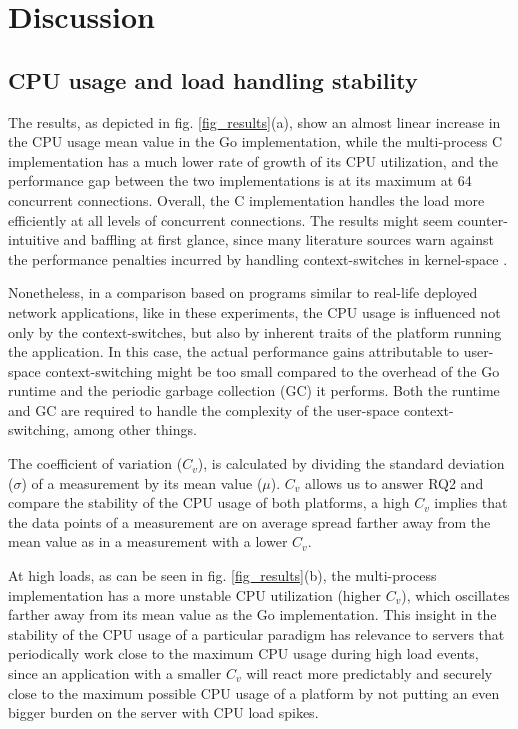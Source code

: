 \section{Discussion}
\subsection{CPU usage and load handling stability}
The results, as depicted in fig. \ref{fig_results}(a), show an almost linear increase in the CPU usage mean value in the Go implementation, while the multi-process C implementation has a much lower rate of growth of its CPU utilization, and the performance gap between the two implementations is at its maximum at 64 concurrent connections. Overall, the C implementation handles the load more efficiently at all levels of concurrent connections. The results might seem counter-intuitive and baffling at first glance, since many literature sources warn against the performance penalties incurred by handling context-switches in kernel-space \cite{Cox-Buday2017}\cite{Kerrisk2010}. 

Nonetheless, in a comparison based on programs similar to real-life deployed network applications, like in these experiments, the CPU usage is influenced not only by the context-switches, but also by inherent traits of the platform running the application. In this case, the actual performance gains attributable to user-space context-switching might be too small compared to the overhead of the Go runtime and the periodic garbage collection (GC) it performs. Both the runtime and GC are required to handle the complexity of the user-space context-switching, among other things.

The coefficient of variation ($C_v$), is calculated by dividing the standard deviation ($\sigma$) of a measurement by its mean value ($\mu$). $C_v$ allows us to answer RQ2 and compare the stability of the CPU usage of both platforms, a high $C_v$ implies that the data points of a measurement are on average spread farther away from the mean value as in a measurement with a lower $C_v$. 

At high loads, as can be seen in fig. \ref{fig_results}(b), the multi-process implementation has a more unstable CPU utilization (higher $C_v$), which oscillates farther away from its mean value as the Go implementation. This insight in the stability of the CPU usage of a particular paradigm has relevance to servers that periodically work close to the maximum CPU usage during high load events, since an application with a smaller $C_v$ will react more predictably and securely close to the maximum possible CPU usage of a platform by not putting an even bigger burden on the server with CPU load spikes.

